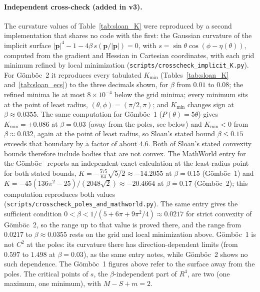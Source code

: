 \documentclass[11pt,a4paper]{article}
\begin{document}
\paragraph{Independent cross-check (added in v3).} The curvature
values of Table~\ref{tab:sloan_K} were reproduced by a second
implementation that shares no code with the first: the Gaussian
curvature of the implicit surface
$|\mathbf{p}|^4 - 1 - 4\beta\, s(\mathbf{p}/|\mathbf{p}|) = 0$, with
$s = \sin\theta\cos(\phi - \eta(\theta))$, computed from the gradient
and Hessian in Cartesian coordinates, with each grid minimum refined by
local minimization (\texttt{scripts/crosscheck\_implicit\_K.py}). For
G\"omb\"oc~2 it reproduces every tabulated $K_{\min}$ (Tables~\ref{tab:sloan_K}
and~\ref{tab:sloan_ecs}) to the three decimals shown, for $\beta$ from
$0.01$ to $0.08$; the refined minima lie at most
$8 \times 10^{-4}$ below the grid minima; every minimum sits at the
point of least radius, $(\theta,\phi) = (\pi/2, \pi)$; and $K_{\min}$
changes sign at $\beta \approx 0.0355$. The same computation for
G\"omb\"oc~1 ($P(\theta) = 5\theta$) gives $K_{\min} = +0.086$ at
$\beta = 0.03$ (away from the poles, see below) and $K_{\min} < 0$ from $\beta \approx 0.032$, again at
the point of least radius, so Sloan's stated bound $\beta \le 0.15$
exceeds that boundary by a factor of about $4.6$. Both of Sloan's
stated convexity bounds therefore include bodies that are not convex.
The MathWorld entry for the G\"omb\"oc~\cite{mathworld_gomboc} reports an
independent exact calculation at the least-radius point for both stated
bounds, $K = -\tfrac{575}{64}\sqrt{5/2} \approx -14.2055$ at
$\beta = 0.15$ (G\"omb\"oc~1) and
$K = -45(136\pi^2 - 25)/(2048\sqrt{2}) \approx -20.4664$ at
$\beta = 0.17$ (G\"omb\"oc~2); this computation reproduces both values
(\texttt{scripts/crosscheck\_poles\_and\_mathworld.py}). The same entry gives the
sufficient condition $0 < \beta < 1/(5 + 6\pi + 9\pi^2/4) \approx 0.0217$ for
strict convexity of G\"omb\"oc~2, so the range up to that value is proved
there, and the range from $0.0217$ to $\beta \approx 0.0355$ rests on the
grid and local minimization above. G\"omb\"oc~1 is not $C^2$ at the poles:
its curvature there has direction-dependent limits (from $0.597$ to $1.498$
at $\beta = 0.03$), as the same entry notes, while G\"omb\"oc~2 shows no such
dependence. The G\"omb\"oc~1 figures above refer to the surface away from the
poles.
The critical points of $s$, the $\beta$-independent part of $R^4$, are
two (one maximum, one minimum), with $M - S + m = 2$.
\end{document}
